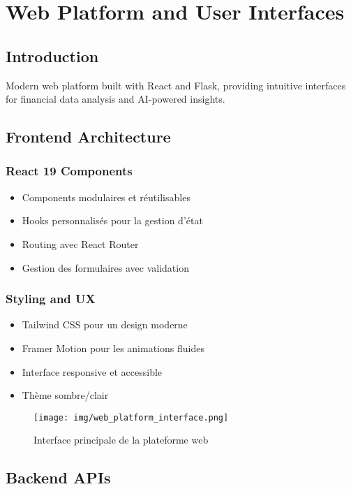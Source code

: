 \section{Web Platform and User Interfaces}

\subsection{Introduction}
Modern web platform built with React and Flask, providing intuitive interfaces for financial data analysis and AI-powered insights.

\subsection{Frontend Architecture}
\subsubsection{React 19 Components}
\begin{itemize}
    \item Components modulaires et réutilisables
    \item Hooks personnalisés pour la gestion d'état
    \item Routing avec React Router
    \item Gestion des formulaires avec validation
\end{itemize}

\subsubsection{Styling and UX}
\begin{itemize}
    \item Tailwind CSS pour un design moderne
    \item Framer Motion pour les animations fluides
    \item Interface responsive et accessible
    \item Thème sombre/clair
\end{itemize}

\begin{figure}[H]
    \centering
    \texttt{[image: img/web\_platform\_interface.png]}
    \caption{Interface principale de la plateforme web}
    \label{fig:web_platform_interface}
\end{figure}

\subsection{Backend APIs}
